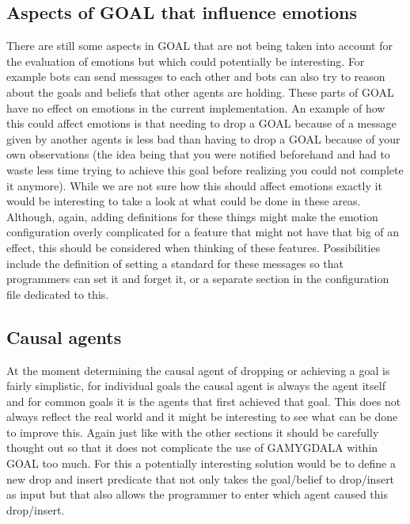 \documentclass[11pt]{article}
\begin{document}
\subsection{Aspects of GOAL that influence emotions}
There are still some aspects in GOAL that are not being taken into account for the evaluation of emotions but which could potentially be interesting. For example bots can send messages to each other and bots can also try to reason about the goals and beliefs that other agents are holding. These parts of GOAL have no effect on emotions in the current implementation. An example of how this could affect emotions is that needing to drop a GOAL because of a message given by another agents is less bad than having to drop a GOAL because of your own observations (the idea being that you were notified beforehand and had to waste less time trying to achieve this goal before realizing you could not complete it anymore). While we are not sure how this should affect emotions exactly it would be interesting to take a look at what could be done in these areas. Although, again, adding definitions for these things might make the emotion configuration overly complicated for a feature that might not have that big of an effect, this should be considered when thinking of these features. Possibilities include the definition of setting a standard for these messages so that programmers can set it and forget it, or a separate section in the configuration file dedicated to this.

\subsection{Causal agents}
At the moment determining the causal agent of dropping or achieving a goal is fairly simplistic, for individual goals the causal agent is always the agent itself and for common goals it is the agents that first achieved that goal. This does not always reflect the real world and it might be interesting to see what can be done to improve this. Again just like with the other sections it should be carefully thought out so that it does not complicate the use of \gls{GAMYGDALA}\cite{GAMYGDALA} within GOAL too much. For this a potentially interesting solution would be to define a new drop and insert predicate that not only takes the goal/belief to drop/insert as input but that also allows the programmer to enter which agent caused this drop/insert.
\end{document}
